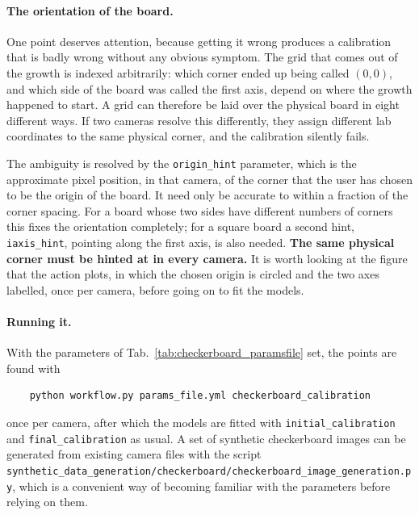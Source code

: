 \documentclass[10pt,a4paper]{article}
\begin{document}
\paragraph{The orientation of the board.} One point deserves attention, because getting it wrong produces a calibration that is badly wrong without any obvious symptom. The grid that comes out of the growth is indexed arbitrarily: which corner ended up being called $(0,0)$, and which side of the board was called the first axis, depend on where the growth happened to start. A grid can therefore be laid over the physical board in eight different ways. If two cameras resolve this differently, they assign different lab coordinates to the same physical corner, and the calibration silently fails.

The ambiguity is resolved by the \texttt{origin\_hint} parameter, which is the approximate pixel position, in that camera, of the corner that the user has chosen to be the origin of the board. It need only be accurate to within a fraction of the corner spacing. For a board whose two sides have different numbers of corners this fixes the orientation completely; for a square board a second hint, \texttt{iaxis\_hint}, pointing along the first axis, is also needed. \textbf{The same physical corner must be hinted at in every camera.} It is worth looking at the figure that the action plots, in which the chosen origin is circled and the two axes labelled, once per camera, before going on to fit the models.

\paragraph{Running it.} With the parameters of Tab.~\ref{tab:checkerboard_paramsfile} set, the points are found with

\begin{verbatim}
    python workflow.py params_file.yml checkerboard_calibration
\end{verbatim}

once per camera, after which the models are fitted with \texttt{initial\_calibration} and \texttt{final\_calibration} as usual. A set of synthetic checkerboard images can be generated from existing camera files with the script \texttt{synthetic\_data\_generation/checkerboard/checkerboard\_image\_generation.py}, which is a convenient way of becoming familiar with the parameters before relying on them.
\end{document}
